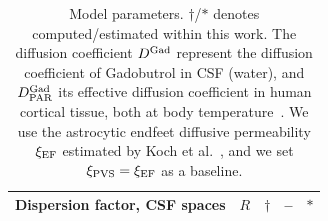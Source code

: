 \documentclass[fleqn,10pt]{wlscirep}
\begin{document}
\begin{table}
\begin{center}
\begin{tabular}{ll|ccc}
      Dispersion factor, CSF spaces & $R$ & $\dagger$ & -- & $\ast$ \\
      \bottomrule
    \end{tabular}
  \end{center}
  \caption{Model parameters. $\dagger$/$\ast$ denotes
    computed/estimated within this work. The diffusion coefficient
    $D^{\rm Gad}$ represent the diffusion coefficient of Gadobutrol in
    CSF (water), and $D^{\rm Gad}_{\rm PAR}$ its effective diffusion
    coefficient in human cortical tissue, both at body
    temperature~\cite{sykova2008diffusion, valnes2020apparent,
      hornkjol2022csf}. We use the astrocytic endfeet diffusive permeability
    $\xi_{\rm EF}$ estimated by Koch et al.~\cite{koch2023estimates},
    and we set $\xi_{\rm PVS} = \xi_{\rm EF}$ as a baseline.}
  \label{tab:parameters}
\end{table}
\end{document}
